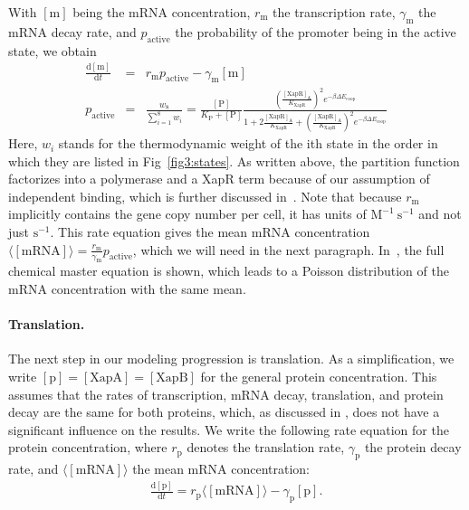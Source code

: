 \documentclass[10pt,letterpaper]{article}
\newcommand{\n}[1]{\mathrm{#1}}
\newcommand{\dd}[2]{\frac{\mathrm{d} #1}{\mathrm{d} #2}}
\begin{document}
With $\n{[m]}$ being the mRNA concentration, $r_{\n{m}}$ the transcription
rate, $\gamma_{\n{m}}$ the mRNA decay rate, and $p_{\n{active}}$ the
probability of the promoter being in the active state, we obtain
\begin{eqnarray}
\label{eq:mbasic}
\dd{\n{[m]}}{t} &=& r_{\n{m}} p_{\n{active}} - \gamma_{\n{m}} \n{[m]} \\
p_{\n{active}} &=& \frac{w_8}{\sum_{i=1}^{8} w_i} = 
\frac{\n{[P]}}{K_{\n{P}}+\n{[P]}} 
\frac{
	\left( \frac{\mathrm{[XapR]_A}}{K_{\mathrm{XapR}}} \right)^2 
	e^{- \beta \Delta E_{\n{coop}}}
}{
	1 + 
	2 \frac{\mathrm{[XapR]_A}}{K_{\mathrm{XapR}}} +
	\left( \frac{\mathrm{[XapR]_A}}{K_{\mathrm{XapR}}} \right)^2 e^{- \beta \Delta E_{\n{coop}}}
}
\end{eqnarray}
Here, $w_i$ stands for the thermodynamic weight of the ith state in the
order in which they are listed in Fig~\ref{fig3:states}. As written above,
the partition function factorizes into a polymerase and a XapR term because
of our assumption of independent binding, which is further discussed
in~. Note that because $r_{\n{m}}$ implicitly contains the
gene copy number per cell, it has units of $\n{M^{-1} \ s^{-1}}$ and not
just $\n{s^{-1}}$. This rate equation gives the mean mRNA concentration
$\langle\n{[mRNA]}\rangle = \frac{r_{\n{m}}}{\gamma_{\n{m}}}
p_{\n{active}}$, which we will need in the next paragraph.
In~, the full chemical master equation is shown, which
leads to a 
Poisson distribution of the mRNA concentration with the same
mean.

\paragraph*{Translation.} 
The next step in our modeling progression is translation. As a
simplification, we write $\n{[p]}=\n{[XapA]=[XapB]}$ for the general protein
concentration. This assumes that the rates of transcription, mRNA decay,
translation, and protein decay are the same for both proteins, which, as
discussed in , does not have a significant influence on the
results. We write the following rate equation for the protein concentration,
where $r_{\n{p}}$ denotes the translation rate, $\gamma_{\n{p}}$ the protein
decay rate, and $\langle \n{[mRNA]} \rangle$ the mean mRNA concentration:
\begin{eqnarray}
\label{eq:pbasic}
\dd{\n{[p]}}{t} = r_{\n{p}} \langle \n{[mRNA]} \rangle - \gamma_{\n{p}} \n{[p]}.
\end{eqnarray}
\end{document}
